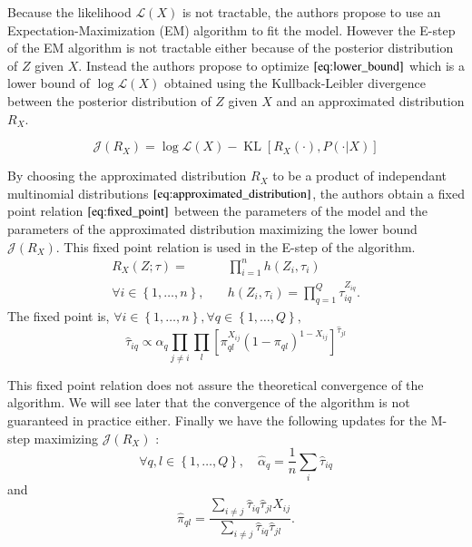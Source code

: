 \documentclass[switch, 12pt]{article}
\DeclareMathOperator*{\KL}{KL}
\begin{document}
\begin{multicols}{2}
    Because the likelihood $\mathcal{L}(X)$ is not tractable, the authors propose to use an Expectation-Maximization (EM) algorithm to fit the model. However the E-step of the EM algorithm is not tractable either because of the posterior distribution of $Z$ given $X$. Instead the authors propose to optimize $\eqref{eq:lower_bound}$ which is a lower bound of $\log\mathcal{L}(X)$ obtained using the Kullback-Leibler divergence between the posterior distribution of $Z$ given $X$ and an approximated distribution $R_X$.

    \begin{equation}
        \label{eq:lower_bound}
        \mathcal{J}(R_X)=\log \mathcal{L}(X)-\KL[R_X(\cdot), P(\cdot|X)]
    \end{equation}

    By choosing the approximated distribution $R_X$ to be a product of independant multinomial distributions $\eqref{eq:approximated_distribution}$, the authors obtain a fixed point relation $\eqref{eq:fixed_point}$ between the parameters of the model and the parameters of the approximated distribution maximizing the lower bound $\mathcal{J}(R_X)$. This fixed point relation is used in the E-step of the algorithm.
    \begin{equation}
        \label{eq:approximated_distribution}
        \begin{aligned}
            R_X(Z; \tau)=                                 & \prod_{i=1}^n h(Z_i, \tau_i)                     \\
            \forall i \in \left\{1,\dots,n\right\}, \quad & h(Z_i, \tau_i)=\prod_{q=1}^Q \tau_{iq}^{Z_{iq}}.
        \end{aligned}
    \end{equation}
    The fixed point is, $\forall i \in \left\{1,\dots,n\right\}, \forall q \in \left\{1,\dots,Q\right\},$
    \begin{equation}
        \label{eq:fixed_point}
        \hat{\tau}_{iq}\propto \alpha_q \prod_{j\neq i}\prod_l \left[\pi_{ql}^{X_{ij}}(1-\pi_{ql})^{1-X_{ij}}\right]^{\hat{\tau}_{jl}}
    \end{equation}

    This fixed point relation does not assure the theoretical convergence of the algorithm. We will see later that the convergence of the algorithm is not guaranteed in practice either. Finally we have the following updates for the M-step maximizing $\mathcal{J}(R_X)$ :
    \begin{equation}
        \label{eq:m_step}
        \forall q, l \in \left\{1,\dots,Q\right\}, \quad
        \hat{\alpha}_q=\frac{1}{n}\sum_{i} \hat{\tau}_{iq}
    \end{equation}
    and
    \begin{equation}
        \hat{\pi}_{ql}=\frac{\sum_{i\neq j} \hat{\tau}_{iq}\hat{\tau}_{jl}X_{ij}}{\sum_{i\neq j} \hat{\tau}_{iq}\hat{\tau}_{jl}}.
    \end{equation}


\end{multicols}
\end{document}
